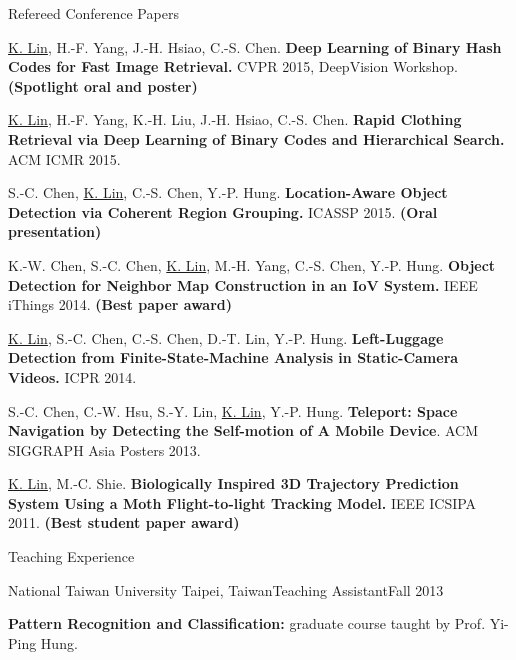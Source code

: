 \documentclass{resume} %
\begin{document}
\begin{rSection}{Refereed Conference Papers}
\begin{myPublication}
   
\item \underline{K. Lin}, H.-F. Yang, J.-H. Hsiao, C.-S. Chen. \textbf{Deep Learning of Binary Hash Codes for Fast Image Retrieval.} CVPR 2015, DeepVision Workshop. \textbf{(Spotlight oral and poster)}
   
\item \underline{K. Lin}, H.-F. Yang, K.-H. Liu, J.-H. Hsiao, C.-S. Chen. \textbf{Rapid Clothing Retrieval via Deep Learning of Binary Codes and Hierarchical Search.} ACM ICMR 2015. 
   
\item S.-C. Chen, \underline{K. Lin}, C.-S. Chen, Y.-P. Hung. \textbf{Location-Aware Object Detection via Coherent Region Grouping.} ICASSP 2015. \textbf{(Oral presentation)}
  
\item K.-W. Chen, S.-C. Chen, \underline{K. Lin}, M.-H. Yang, C.-S. Chen, Y.-P. Hung. \textbf{Object Detection for Neighbor Map Construction in an IoV System.} IEEE iThings 2014. \textbf{(Best paper award)}

\item \underline{K. Lin}, S.-C. Chen, C.-S. Chen, D.-T. Lin, Y.-P. Hung. \textbf{Left-Luggage Detection from Finite-State-Machine Analysis in Static-Camera Videos.} ICPR 2014.

\item S.-C. Chen, C.-W. Hsu, S.-Y. Lin, \underline{K. Lin}, Y.-P. Hung. \textbf{Teleport: Space Navigation by Detecting the Self-motion of A Mobile Device}. ACM SIGGRAPH Asia Posters 2013.

\item \underline{K. Lin}, M.-C. Shie. \textbf{Biologically Inspired 3D Trajectory Prediction System Using a Moth Flight-to-light Tracking Model.} IEEE ICSIPA 2011. \textbf{(Best student paper award)}
        
        
\end{myPublication}
\end{rSection}


\begin{rSection}{Teaching Experience}

\begin{mySubsection}{National Taiwan University }{Taipei, Taiwan}{Teaching Assistant}{Fall 2013}
\item \textbf{Pattern Recognition and Classification:} graduate course taught by Prof. Yi-Ping Hung.
\end{mySubsection}


\end{rSection}
\end{document}
